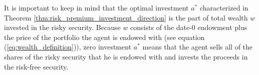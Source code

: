 \documentclass[\topdir/lecture\_notes.tex]{subfiles}
\begin{document}
It is important to keep in mind that the optimal investment \(a^{*}\) characterized in Theorem \ref{thm:risk_premium_investment_direction} is the part of total wealth \(w\) invested in the risky security. Because \(w\) consists of the date-\(0\) endowment plus the price of the portfolio the agent is endowed with (see equation (\ref{eq:wealth_definition})), zero investment \(a^{*}\) means that the agent sells all of the shares of the risky security that he is endowed with and invests the proceeds in the risk-free security.


\end{document}
